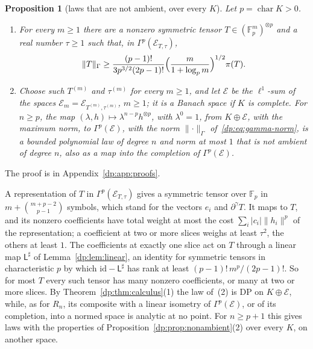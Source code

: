 \documentclass[11pt]{amsart}
\newtheorem{proposition}[theorem]{Proposition}
\theoremstyle{definition}
\theoremstyle{remark}
\numberwithin{equation}{section}
\newcommand{\F}{\mathbb F}
\newcommand{\id}{\mathrm{id}}
\newcommand{\abs}[1]{\lvert #1\rvert}
\newcommand{\norm}[1]{\lVert #1\rVert}
\theoremstyle{plain}
\theoremstyle{definition}
\theoremstyle{plain}
\begin{document}
\begin{proposition}[laws that are not ambient, over every $K$]\label{dp:prop:degree-p}
Let $p=\operatorname{char}K>0$.
\begin{enumerate}
\item For every $m\ge1$ there are a nonzero symmetric tensor $T\in(\F_p^m)^{\otimes p}$ and a real number $\tau\ge1$ such that, in $\Gamma^p(\mathcal E_{T,\tau})$,
\begin{equation}\label{dp:eq:degree-p-ratio}
 \norm T_\Gamma\ge\frac{(p-1)!}{3p^{3/2}(2p-1)!}\Bigl(\frac m{1+\log_pm}\Bigr)^{1/2}\pi(T).
\end{equation}
\item Choose such $T^{(m)}$ and $\tau^{(m)}$ for every $m\ge1$, and let $\mathcal E$ be the $\ell^1$-sum of the spaces $\mathcal E_m=\mathcal E_{T^{(m)},\tau^{(m)}}$, $m\ge1$; it is a Banach space if $K$ is complete. For $n\ge p$, the map $(\lambda,h)\mapsto\lambda^{n-p}h^{\otimes p}$, with $\lambda^0=1$, from $K\oplus\mathcal E$, with the maximum norm, to $\Gamma^p(\mathcal E)$, with the norm $\norm\cdot_\Gamma$ of~\eqref{dp:eq:gamma-norm}, is a bounded polynomial law of degree $n$ and norm at most $1$ that is not ambient of degree $n$, also as a map into the completion of $\Gamma^p(\mathcal E)$.
\end{enumerate}
\end{proposition}
The proof is in Appendix~\ref{dp:app:proofs}.

A representation of $T$ in $\Gamma^p(\mathcal E_{T,\tau})$ gives a symmetric tensor over $\F_p$ in $m+\binom{m+p-2}{p-1}$ symbols, which stand for the vectors $e_i$ and $\partial^\gamma T$. It maps to $T$, and its nonzero coefficients have total weight at most the cost $\sum_i\abs{c_i}\norm{h_i}^p$ of the representation; a coefficient at two or more slices weighs at least $\tau^2$, the others at least $1$. The coefficients at exactly one slice act on $T$ through a linear map $\mathsf L^\sharp$ of Lemma~\ref{dp:lem:linear}, an identity for symmetric tensors in characteristic $p$ by which $\id-\mathsf L^\sharp$ has rank at least $(p-1)!\,m^p/(2p-1)!$. So for most $T$ every such tensor has many nonzero coefficients, or many at two or more slices. By Theorem~\ref{dp:thm:calculus}(1) the law of~(2) is DP on $K\oplus\mathcal E$, while, as for $R_n$, its composite with a linear isometry of $\Gamma^p(\mathcal E)$, or of its completion, into a normed space is analytic at no point. For $n\ge p+1$ this gives laws with the properties of Proposition~\ref{dp:prop:nonambient}(2) over every $K$, on another space.
\end{document}
